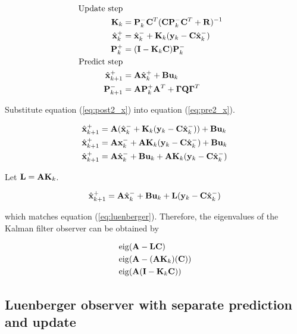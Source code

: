 \begin{align}
  \text{Update step} \nonumber \\
  \mathbf{K}_k &= \mathbf{P}_k^- \mathbf{C}^T (\mathbf{C}\mathbf{P}_k^- \mathbf{C}^T +
    \mathbf{R})^{-1} \\
  \hat{\mathbf{x}}_k^+ &= \hat{\mathbf{x}}_k^- + \mathbf{K}_k(\mathbf{y}_k -
    \mathbf{C}\hat{\mathbf{x}}_k^-) \label{eq:post2_x} \\
  \mathbf{P}_k^+ &= (\mathbf{I} - \mathbf{K}_k\mathbf{C})\mathbf{P}_k^- \\
  \text{Predict step} \nonumber \\
  \hat{\mathbf{x}}_{k+1}^+ &= \mathbf{A}\hat{\mathbf{x}}_k^+ + \mathbf{B}\mathbf{u}_k
    \label{eq:pre2_x} \\
  \mathbf{P}_{k+1}^- &= \mathbf{A} \mathbf{P}_k^+ \mathbf{A}^T +
    \mathbf{\Gamma}\mathbf{Q}\mathbf{\Gamma}^T
\end{align}

Substitute equation (\ref{eq:post2_x}) into equation (\ref{eq:pre2_x}).

\begin{align*}
  \hat{\mathbf{x}}_{k+1}^+ &= \mathbf{A}(\hat{\mathbf{x}}_k^- + \mathbf{K}_k(\mathbf{y}_k -
    \mathbf{C}\hat{\mathbf{x}}_k^-)) + \mathbf{B}\mathbf{u}_k \\
  \hat{\mathbf{x}}_{k+1}^+ &= \mathbf{A}\mathbf{x}_k^- + \mathbf{A}\mathbf{K}_k(\mathbf{y}_k -
    \mathbf{C}\hat{\mathbf{x}}_k^-) + \mathbf{B}\mathbf{u}_k \\
  \hat{\mathbf{x}}_{k+1}^+ &= \mathbf{A}\hat{\mathbf{x}}_k^- + \mathbf{B}\mathbf{u}_k +
    \mathbf{A}\mathbf{K}_k(\mathbf{y}_k - \mathbf{C}\hat{\mathbf{x}}_k^-)
\end{align*}

Let $\mathbf{L} = \mathbf{A} \mathbf{K}_k$.

\begin{equation} \label{eq:app_kalman_leunberger}
  \hat{\mathbf{x}}_{k+1}^+ = \mathbf{A}\hat{\mathbf{x}}_k^- + \mathbf{B}\mathbf{u}_k + \mathbf{L}
    (\mathbf{y}_k - \mathbf{C}\hat{\mathbf{x}}_k^-)
\end{equation}

which matches equation (\ref{eq:luenberger}). Therefore, the eigenvalues of the
Kalman filter \gls{observer} can be obtained by

\begin{align}
  &\operatorname{eig}(\mathbf{A} - \mathbf{L}\mathbf{C}) \nonumber \\
  &\operatorname{eig}(\mathbf{A} - (\mathbf{A}\mathbf{K}_k)(\mathbf{C})) \nonumber \\
  &\operatorname{eig}(\mathbf{A}(\mathbf{I} - \mathbf{K}_k\mathbf{C}))
\end{align}

\subsection{Luenberger observer with separate prediction and update}
\label{subsec:deriv_luenberger_separate}


